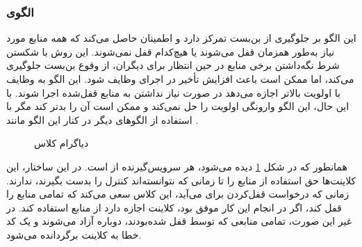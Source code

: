 \subsubsection{الگوی }
\label{scheduleSimLockingSec}
\begin{RTL}
این الگو \cite{ref1} بر جلوگیری از بن‌بست تمرکز دارد
و اطمینان حاصل می‌کند که همه منابع مورد نیاز به‌طور همزمان قفل می‌شوند
یا هیچ‌کدام قفل نمی‌شوند. این روش با شکستن شرط نگه‌داشتن
برخی منابع در حین انتظار برای دیگران، از وقوع بن‌بست جلوگیری می‌کند،
اما ممکن است باعث افزایش تأخیر در اجرای وظایف شود.
این الگو به وظایف با اولویت بالاتر اجازه می‌دهد در صورت نیاز نداشتن
به منابع قفل‌شده اجرا شوند. با این حال، این الگو وارونگی اولویت
را حل نمی‌کند و ممکن است آن را بدتر کند مگر با استفاده
از الگوهای دیگر در
کنار این الگو مانند .
\end{RTL}
\begin{figure}[h!]
\centering
{}
\caption{دیاگرام کلاس }
\label{scheduleSimLockingClassDiag}
\end{figure}
\begin{RTL}
همانطور که در شکل \ref{scheduleSimLockingClassDiag}
دیده می‌شود، هر  سرویس‌گیرنده از
 است. در این ساختار، این کلاینت‌ها
حق استفاده از منابع را تا زمانی که نتوانسته‌اند کنترل 
را بدست بگیرند، ندارند. زمانی که درخواست قفل‌کردن برای
 می‌آید، این کلاس سعی می‌کند که تمامی منابع
را قفل کند، اگر در انجام این کار موفق بود، کلاینت اجازه دارد از منابع استفاده کند.
در غیر این صورت، تمامی منابعی که توسط 
قفل شده‌بودند، دوباره آزاد می‌شوند و یک کد خطا به کلاینت برگردانده می‌شود.
\end{RTL}